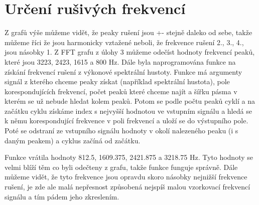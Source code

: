 \section{Určení rušivých frekvencí}
\label{sec:noise_freq}

Z grafů výše můžeme vidět, že peaky rušení jsou +- stejně daleko od sebe, takže můžeme říci že jsou harmonicky vztažené neboli, že frekvence rušení 2., 3., 4., jsou násobky 1.
Z FFT grafu z úlohy 3 můžeme odečíst hodnoty frekvencí peaků, které jsou 3223, 2423, 1615 a 800 Hz.
Dále byla naprogramována funkce na získání frekvencí rušení z výkonové spektrální hustoty.
Funkce má argumenty signál z kterého chceme peaky získat (například spektrální hustota), pole korespondujících frekvencí, počet peaků které chceme najít a šířku pásma v kterém se už nebude hledat kolem peaků.
Potom se podle počtu peaků cyklí a na začátku cyklu získáme index s nejvyšší hodnotou ve vstupním signálu a hledá se k němu korespondující frekvence v poli frekvencí a uloží se do výstupního pole.
Poté se odstraní ze vstupního signálu hodnoty v okolí nalezeného peaku (i s daným peakem) a cyklus začíná od začátku.

Funkce vrátila hodnoty 812.5, 1609.375, 2421.875 a 3218.75 Hz.
Tyto hodnoty se velmi blíží těm co byli odečteny z grafu, takže funkce funguje správně.
Dále můžeme vidět, že tyto frekvence jsou opravdu skoro násobky nejnižší frekvence rušení, je zde ale malá nepřesnost způsobená nejspíš malou vzorkovací frekvencí signálu a tím pádem jeho zkreslením.
